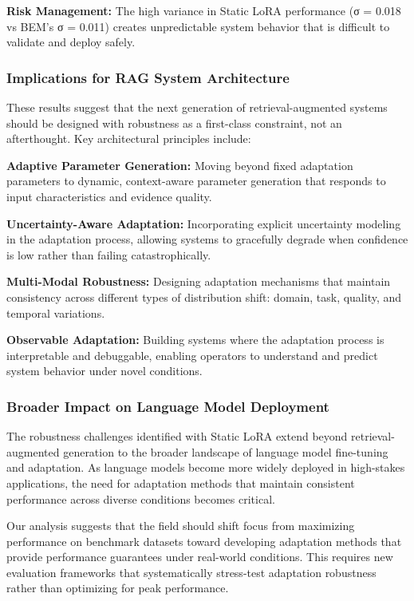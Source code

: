 \textbf{Risk Management:} The high variance in Static LoRA performance (σ = 0.018 vs BEM's σ = 0.011) creates unpredictable system behavior that is difficult to validate and deploy safely.

\subsubsection{Implications for RAG System Architecture}

These results suggest that the next generation of retrieval-augmented systems should be designed with robustness as a first-class constraint, not an afterthought. Key architectural principles include:

\textbf{Adaptive Parameter Generation:} Moving beyond fixed adaptation parameters to dynamic, context-aware parameter generation that responds to input characteristics and evidence quality.

\textbf{Uncertainty-Aware Adaptation:} Incorporating explicit uncertainty modeling in the adaptation process, allowing systems to gracefully degrade when confidence is low rather than failing catastrophically.

\textbf{Multi-Modal Robustness:} Designing adaptation mechanisms that maintain consistency across different types of distribution shift: domain, task, quality, and temporal variations.

\textbf{Observable Adaptation:} Building systems where the adaptation process is interpretable and debuggable, enabling operators to understand and predict system behavior under novel conditions.

\subsubsection{Broader Impact on Language Model Deployment}

The robustness challenges identified with Static LoRA extend beyond retrieval-augmented generation to the broader landscape of language model fine-tuning and adaptation. As language models become more widely deployed in high-stakes applications, the need for adaptation methods that maintain consistent performance across diverse conditions becomes critical.

Our analysis suggests that the field should shift focus from maximizing performance on benchmark datasets toward developing adaptation methods that provide performance guarantees under real-world conditions. This requires new evaluation frameworks that systematically stress-test adaptation robustness rather than optimizing for peak performance.

